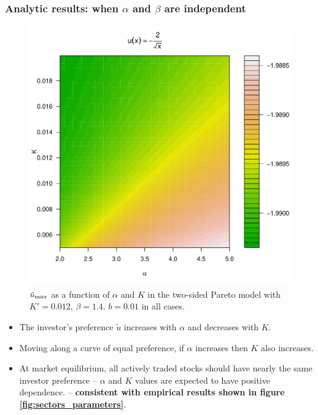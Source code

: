 \documentclass{beamer}
\begin{document}
\begin{frame}
  \frametitle{Analytic results: when $\alpha$ and  $\beta$ are independent}
  \begin{minipage}[t]{0.5\linewidth}
    \begin{figure}[htb!]
      \includegraphics[width=\textwidth]{preference_pareto5e-1_A.pdf}
      \caption{\scriptsize
        $\tilde u_{\rm max}$ as a function of $\alpha$ and $K$
        in the two-sided Pareto model with $K'=0.012$, $\beta = 1.4$.
        $b = 0.01$ in all cases.
      }
    \end{figure}
  \end{minipage}\hfill
  \begin{minipage}[t]{0.5\linewidth}
    \begin{small}
      \begin{itemize}
      \item The investor's preference $\tilde u$ increases with $\alpha$ and
        decreases with $K$.
      \item Moving along a curve of equal preference, if $\alpha$
        increases then $K$ also increases.
      \item At market equilibrium, all actively traded stocks should
        have nearly the same investor preference -- $\alpha$ and
        $K$ values are expected to have positive dependence.
        -- {\bf consistent with empirical results shown in figure
          \ref{fig:sectors_parameters}}.
      \end{itemize}
    \end{small}
  \end{minipage}
\end{frame}
\end{document}
